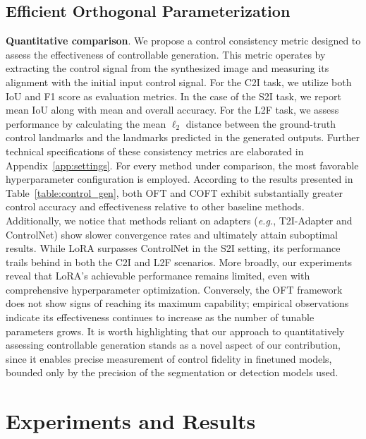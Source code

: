 \begin{itemize}[leftmargin=*,nosep]
\begin{itemize}[leftmargin=*,nosep]
\subsection{Efficient Orthogonal Parameterization}\label{sect:eff_ortho}

\textbf{Quantitative comparison}. We propose a control consistency metric designed to assess the effectiveness of controllable generation. This metric operates by extracting the control signal from the synthesized image and measuring its alignment with the initial input control signal. For the C2I task, we utilize both IoU and F1 score as evaluation metrics. In the case of the S2I task, we report mean IoU along with mean and overall accuracy. For the L2F task, we assess performance by calculating the mean $\ell_2$ distance between the ground-truth control landmarks and the landmarks predicted in the generated outputs. Further technical specifications of these consistency metrics are elaborated in Appendix~\ref{app:settings}. For every method under comparison, the most favorable hyperparameter configuration is employed. According to the results presented in Table~\ref{table:control_gen}, both OFT and COFT exhibit substantially greater control accuracy and effectiveness relative to other baseline methods. Additionally, we notice that methods reliant on adapters (\emph{e.g.}, T2I-Adapter and ControlNet) show slower convergence rates and ultimately attain suboptimal results. While LoRA surpasses ControlNet in the S2I setting, its performance trails behind in both the C2I and L2F scenarios. More broadly, our experiments reveal that LoRA’s achievable performance remains limited, even with comprehensive hyperparameter optimization. Conversely, the OFT framework does not show signs of reaching its maximum capability; empirical observations indicate its effectiveness continues to increase as the number of tunable parameters grows. It is worth highlighting that our approach to quantitatively assessing controllable generation stands as a novel aspect of our contribution, since it enables precise measurement of control fidelity in finetuned models, bounded only by the precision of the segmentation or detection models used.

\section{Experiments and Results}


\end{itemize}
\end{itemize}
